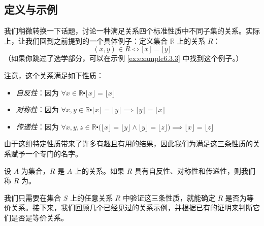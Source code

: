 
\subsection{定义与示例}

我们稍微转换一下话题，讨论一种满足关系四个标准性质中不同子集的关系。实际上，让我们回到之前提到的一个具体例子：定义集合 $\mathbb{R}$ 上的关系 $R$：
\[(x, y) \in R \iff \lfloor x \rfloor = \lfloor y \rfloor\]
（如果你跳过了选学部分，可以在示例 \ref{ex:example6.3.3} 中找到这个例子。）

注意，这个关系满足如下性质：
\begin{itemize}
    \item \emph{自反性}：因为 $\forall x \in \mathbb{R} \centerdot \lfloor x \rfloor = \lfloor x \rfloor$
    \item \emph{对称性}：因为 $\forall x, y \in \mathbb{R} \centerdot \lfloor x \rfloor = \lfloor y \rfloor \implies \lfloor y \rfloor = \lfloor x \rfloor$
    \item \emph{传递性}：因为 $\forall x, y, z \in \mathbb{R} \centerdot \big(\lfloor x \rfloor = \lfloor y \rfloor \land \lfloor y \rfloor = \lfloor z \rfloor \big) \implies \lfloor x \rfloor = \lfloor z \rfloor$
\end{itemize}
由于这组特定性质带来了许多有趣且有用的结果，因此我们为满足这三条性质的关系赋予一个专门的名字。

\begin{definition}
    设 $A$ 为集合，$R$ 是 $A$ 上的关系。如果 $R$ 具有自反性、对称性和传递性，则我们称 $R$ 为。
\end{definition}

我们只需要在集合 $S$ 上的任意关系 $R$ 中验证这三条性质，就能确定 $R$ 是否为等价关系。接下来，我们回顾几个已经见过的关系示例，并根据已有的证明来判断它们是否是等价关系。\\

